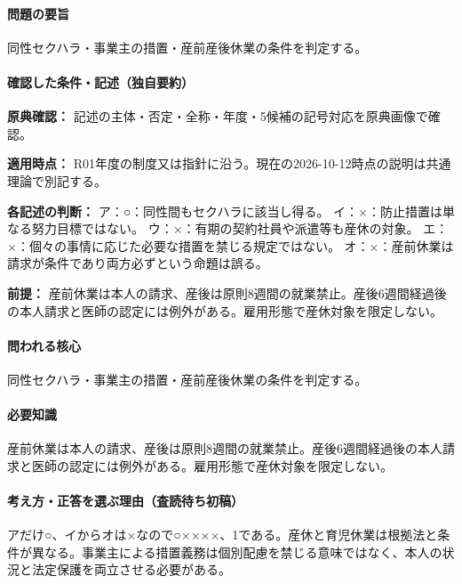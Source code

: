 \paragraph{問題の要旨} 同性セクハラ・事業主の措置・産前産後休業の条件を判定する。

\paragraph{確認した条件・記述（独自要約）}\mbox{}\par

\noindent\textbf{原典確認：} 記述の主体・否定・全称・年度・5候補の記号対応を原典画像で確認。\par

\noindent\textbf{適用時点：} R01年度の制度又は指針に沿う。現在の2026-10-12時点の説明は共通理論で別記する。\par

\noindent\textbf{各記述の判断：} ア：○：同性間もセクハラに該当し得る。 イ：×：防止措置は単なる努力目標ではない。 ウ：×：有期の契約社員や派遣等も産休の対象。 エ：×：個々の事情に応じた必要な措置を禁じる規定ではない。 オ：×：産前休業は請求が条件であり両方必ずという命題は誤る。\par

\noindent\textbf{前提：} 産前休業は本人の請求、産後は原則8週間の就業禁止。産後6週間経過後の本人請求と医師の認定には例外がある。雇用形態で産休対象を限定しない。\par

\paragraph{問われる核心} 同性セクハラ・事業主の措置・産前産後休業の条件を判定する。

\paragraph{必要知識} 産前休業は本人の請求、産後は原則8週間の就業禁止。産後6週間経過後の本人請求と医師の認定には例外がある。雇用形態で産休対象を限定しない。

\paragraph{考え方・正答を選ぶ理由（査読待ち初稿）} アだけ○、イからオは×なので○××××、1である。産休と育児休業は根拠法と条件が異なる。事業主による措置義務は個別配慮を禁じる意味ではなく、本人の状況と法定保護を両立させる必要がある。

